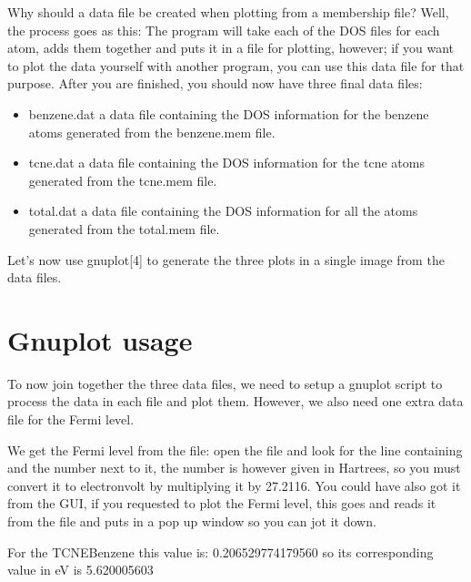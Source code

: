 \documentclass[letterpaper,10pt,english,openany,oneside]{sphinxmanual}
\begin{document}
\sphinxAtStartPar
Why should a data file be created when plotting from a membership file? Well, the process goes as this: The program will take each of the DOS files for each atom, adds them together and puts it in a file for plotting, however; if you want to plot the data yourself with another program, you can use this data file for that purpose.
After you are finished, you should now have three final data files:
\begin{itemize}
\item {} 
\sphinxAtStartPar
benzene.dat a data file containing the DOS information for the benzene atoms generated from the benzene.mem file.

\item {} 
\sphinxAtStartPar
tcne.dat a data file containing the DOS information for the tcne atoms generated from the tcne.mem file.

\item {} 
\sphinxAtStartPar
total.dat a data file containing the DOS information for all the atoms generated from the total.mem file.

\end{itemize}

\sphinxAtStartPar
Let’s now use gnuplot{[}4{]} to generate the three plots in a single image from the data files.


\section{Gnuplot usage}
\label{\detokenize{tutorials/ddos/density_of_states:gnuplot-usage}}
\sphinxAtStartPar
To now join together the three data files, we need to setup a gnuplot script to process the data in each file and plot them. However, we also need one extra data file for the Fermi level.

\sphinxAtStartPar
We get the Fermi level from the  file: open the file and look for the line containing  and the number next to it, the number is however given in Hartrees, so you must convert it to electron\sphinxhyphen{}volt by multiplying it by 27.2116. You could have also got it from the GUI, if you requested to plot the Fermi level, this goes and reads it from the file and puts in a pop up window so you can jot it down.

\sphinxAtStartPar
For the TCNE\sphinxhyphen{}Benzene this value is: \sphinxhyphen{}0.206529774179560 so its corresponding value in eV is \sphinxhyphen{}5.620005603
\end{document}
